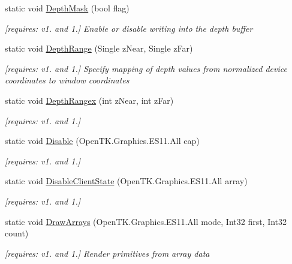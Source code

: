 \begin{DoxyCompactItemize}
static void \hyperlink{class_open_t_k_1_1_graphics_1_1_e_s11_1_1_g_l_a879c35829c9e3299e10ebe7b59b14de4}{Depth\-Mask} (bool flag)
\begin{DoxyCompactList}\small\item\em \mbox{[}requires\-: v1. and 1.\mbox{]} Enable or disable writing into the depth buffer \end{DoxyCompactList}\item 
static void \hyperlink{class_open_t_k_1_1_graphics_1_1_e_s11_1_1_g_l_a33fa781e387acf89b805bd22dc84c353}{Depth\-Range} (Single z\-Near, Single z\-Far)
\begin{DoxyCompactList}\small\item\em \mbox{[}requires\-: v1. and 1.\mbox{]} Specify mapping of depth values from normalized device coordinates to window coordinates \end{DoxyCompactList}\item 
static void \hyperlink{class_open_t_k_1_1_graphics_1_1_e_s11_1_1_g_l_aa9a54048d36aa4e33e74ca5d596cff6e}{Depth\-Rangex} (int z\-Near, int z\-Far)
\begin{DoxyCompactList}\small\item\em \mbox{[}requires\-: v1. and 1.\mbox{]}\end{DoxyCompactList}\item 
static void \hyperlink{class_open_t_k_1_1_graphics_1_1_e_s11_1_1_g_l_a32a8e29f69e50b3f991ebe49c1da15fa}{Disable} (Open\-T\-K.\-Graphics.\-E\-S11.\-All cap)
\begin{DoxyCompactList}\small\item\em \mbox{[}requires\-: v1. and 1.\mbox{]}\end{DoxyCompactList}\item 
static void \hyperlink{class_open_t_k_1_1_graphics_1_1_e_s11_1_1_g_l_a0a99f5cb6d5f531c731a4882195e599f}{Disable\-Client\-State} (Open\-T\-K.\-Graphics.\-E\-S11.\-All array)
\begin{DoxyCompactList}\small\item\em \mbox{[}requires\-: v1. and 1.\mbox{]}\end{DoxyCompactList}\item 
static void \hyperlink{class_open_t_k_1_1_graphics_1_1_e_s11_1_1_g_l_ab87451ee7a48d4b8c60533d64a9dc34f}{Draw\-Arrays} (Open\-T\-K.\-Graphics.\-E\-S11.\-All mode, Int32 first, Int32 count)
\begin{DoxyCompactList}\small\item\em \mbox{[}requires\-: v1. and 1.\mbox{]} Render primitives from array data \end{DoxyCompactList}\item 

\end{DoxyCompactItemize}
